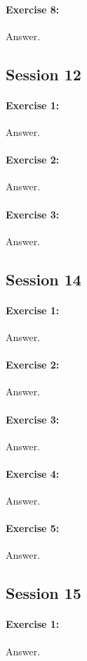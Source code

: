 \documentclass{article}
\begin{document}
\paragraph{Exercise 8:}
Answer.
\newpage

\subsection*{Session 12}
\paragraph{Exercise 1:}
Answer.
\paragraph{Exercise 2:}
Answer.
\paragraph{Exercise 3:}
Answer.
\newpage

\subsection*{Session 14}
\paragraph{Exercise 1:}
Answer.
\paragraph{Exercise 2:}
Answer.
\paragraph{Exercise 3:}
Answer.
\paragraph{Exercise 4:}
Answer.
\paragraph{Exercise 5:}
Answer.
\newpage

\subsection*{Session 15}
\paragraph{Exercise 1:}
Answer.
\end{document}
